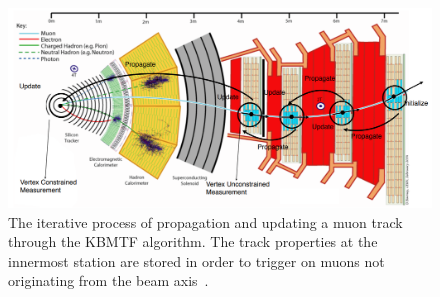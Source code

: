 \begin{figure} [htb!]
	\centering
	\includegraphics[width=0.85\linewidth]{figs/04_muons/kbmtf_diagram.png}
	\caption[The iterative process of propagation and updating a muon track through the KBMTF algorithm. The track properties at the innermost station are stored in order to trigger on muons not originating from the beam axis~\cite{CERN-LHCC-2020-004}]
	{The iterative process of propagation and updating a muon track through the KBMTF algorithm. The track properties at the innermost station are stored in order to trigger on muons not originating from the beam axis~\cite{CERN-LHCC-2020-004}.}
	\label{fig:kbmtf}
\end{figure}

